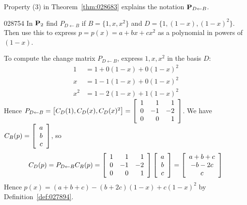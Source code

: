 \noindent Property (3) in Theorem~\ref{thm:028683} explains the notation $\textbf{P}_{D \gets B}$.

\begin{example}{}{028754}
In $\textbf{P}_{2}$ find $P_{D \gets B}$ if $B = \{1, x, x^{2}\}$ and $D = \{1, (1 - x), (1 - x)^{2}\}$. Then use this to express $p = p(x) = a + bx + cx^{2}$ as a polynomial in powers of $(1 - x)$.


\begin{solution}
  To compute the change matrix $P_{D \gets B}$, express $1, x, x^{2}$ in the basis $D$:
\begin{align*}
1 & = 1 + 0(1 - x) + 0(1 - x)^2 \\
x & = 1 - 1(1 - x) + 0(1 - x)^2 \\
x^2 & = 1 - 2(1 - x) + 1(1 - x)^2
\end{align*}
Hence $P_{D \gets B} = \left[ C_D(1), C_D(x), C_D(x)^2 \right] = \left[ \begin{array}{rrr} 1 & 1 & 1 \\ 0 & -1 & -2 \\ 0 & 0 & 1 \end{array} \right]$. We have $C_B(p) = \left[ \begin{array}{c} a \\ b \\ c \end{array} \right]$, so
\begin{equation*}
C_D(p) = P_{D \gets B}C_B(p) = \left[ \begin{array}{rrr} 1 & 1 & 1 \\ 0 & -1 & -2 \\ 0 & 0 & 1 \end{array} \right] \left[ \begin{array}{c} a \\ b \\ c \end{array} \right] = \left[ \begin{array}{c} a + b + c \\ -b - 2c \\ c \end{array} \right]
\end{equation*}
Hence $p(x) = (a + b + c) - (b + 2c)(1 - x) + c(1 - x)^{2}$ by Definition~\ref{def:027894}.\footnotemark
\end{solution}
\end{example}

